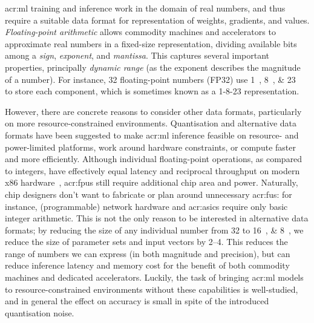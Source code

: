 \gls{acr:ml} training and inference work in the domain of real numbers, and thus require a suitable data format for representation of weights, gradients, and values.
\emph{Floating-point arithmetic} allows commodity machines and accelerators to approximate real numbers in a fixed-size representation, dividing available bits among a \emph{sign}, \emph{exponent}, and \emph{mantissa}.
This captures several important properties, principally \emph{dynamic range} (as the exponent describes the magnitude of a number).
For instance, \qty{32}{\bit} floating-point numbers (FP32) use \qtylist{1; 8; 23}{\bit} to store each component, which is sometimes known as a 1-8-23 representation.

However, there are concrete reasons to consider other data formats, particularly on more resource-constrained environments.
Quantisation and alternative data formats have been suggested to make \gls{acr:ml} inference feasible on resource- and power-limited platforms, work around hardware constraints, or compute faster and more efficiently.
Although individual floating-point operations, as compared to integers, have effectively equal latency and reciprocal throughput on modern x86 hardware~\parencite{agner-x86}, \glspl{acr:fpu} still require additional chip area and power.
Naturally, chip designers don't want to fabricate or plan around unnecessary \glspl{acr:fu}: for instance, (programmable) network hardware and \glspl{acr:asic} require only basic integer arithmetic.
This is not the only reason to be interested in alternative data formats; by reducing the size of any individual number from \qty{32}{\bit} to \qtylist[list-pair-separator = { or }]{16; 8}{\bit}, we reduce the size of parameter sets and input vectors by \qtyrange{2}{4}{\times}.
This reduces the range of numbers we can express (in both magnitude and precision), but can reduce inference latency and memory cost for the benefit of both commodity machines and dedicated accelerators.
Luckily, the task of bringing \gls{acr:ml} models to resource-constrained environments without these capabilities is well-studied, and in general the effect on accuracy is small in spite of the introduced quantisation noise.

